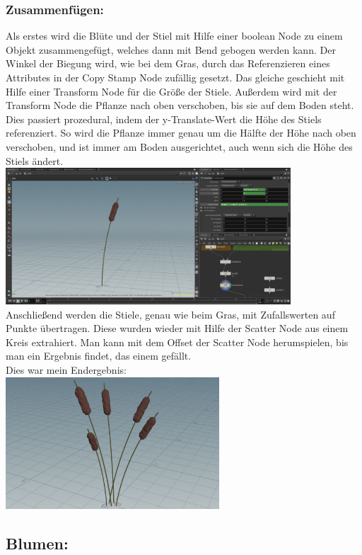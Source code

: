 \documentclass[paper=a4,fontsize=12pt,ngerman]{scrartcl}
\begin{document}
	\subsubsection*{Zusammenfügen:}
	Als erstes wird die Blüte und der Stiel mit Hilfe einer boolean Node zu einem Objekt zusammengefügt, welches dann mit Bend gebogen werden kann. Der Winkel der Biegung wird, wie bei dem Gras, durch das Referenzieren eines Attributes in der Copy Stamp Node zufällig gesetzt. Das gleiche geschieht mit Hilfe einer Transform Node für die Größe der Stiele. Außerdem wird mit der Transform Node die Pflanze nach oben verschoben, bis sie auf dem Boden steht. Dies passiert prozedural, indem der y-Translate-Wert die Höhe des Stiels referenziert. So wird die Pflanze immer genau um die Hälfte der Höhe nach oben verschoben, und ist immer am Boden ausgerichtet, auch wenn sich die Höhe des Stiels ändert. \\
	\includegraphics*[width=0.8\textwidth]{graphics/stiel.jpg}\\
	Anschließend werden die Stiele, genau wie beim Gras, mit Zufallswerten auf Punkte übertragen. Diese wurden wieder mit Hilfe der Scatter Node aus einem Kreis extrahiert. Man kann mit dem Offset der Scatter Node herumspielen, bis man ein Ergebnis findet, das einem gefällt.\\
	Dies war mein Endergebnis: \\
	\includegraphics*[width=0.6\textwidth]{graphics/schilf.jpg}\\
	
	\subsection*{Blumen:}
\end{document}
